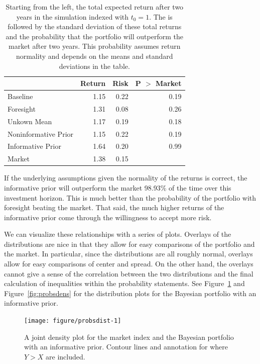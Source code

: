 \documentclass[a4paper]{article}\usepackage[]{graphicx}\usepackage[]{color}
\newenvironment{knitrout}{}{} %
\begin{document}
\begin{table}[ht]
\centering
\begin{tabular}{lrrr}
  \hline
 & Return & Risk & P $>$ Market  \\ 
  \hline
Baseline & 1.15 & 0.22 & 0.19 \\ 
  Foresight & 1.31 & 0.08 & 0.26 \\ 
  Unkown Mean & 1.17 & 0.19 & 0.18 \\ 
  Noninformative Prior & 1.15 & 0.22 & 0.19 \\ 
  Informative Prior & 1.64 & 0.20 & 0.99 \\ 
  Market & 1.38 & 0.15 &  \\ 
   \hline
\end{tabular}
\caption{Starting from the left, the total expected return after two years in the simulation indexed with $t_0 = 1$. The is followed by the standard deviation of these total returns and the probability that the portfolio will outperform the market after two years. This probability assumes return normality and depends on the means and standard deviations in the table.} 
\label{tab:simulations}
\end{table}


If the underlying assumptions given the normality of the returns is correct, the informative prior will outperform the market 98.93\% of the time over this investment horizon. This is much better than the probability of the portfolio with foresight beating the market. That said, the much higher returns of the informative prior come through the willingness to accept more risk.

We can visualize these relationships with a series of plots. Overlays of the distributions are nice in that they allow for easy comparisons of the portfolio and the market. In particular, since the distributions are all roughly normal, overlays allow for easy comparisons of center and spread. On the other hand, the overlays cannot give a sense of the correlation between the two distributions and the final calculation of inequalities within the probability statements. See Figure~\ref{fig:probsdist} and Figure~\ref{fig:probsdens} for the distribution plots for the Bayesian portfolio with an informative prior.

\begin{knitrout}
\color{fgcolor}\begin{figure}
\texttt{[image: figure/probsdist-1]} \caption[A joint density plot for the market index and the Bayesian portfolio with an informative prior]{A joint density plot for the market index and the Bayesian portfolio with an informative prior. Contour lines and annotation for where $Y > X$ are included.\label{fig:probsdist}}
\end{figure}


\end{knitrout}
\end{document}
